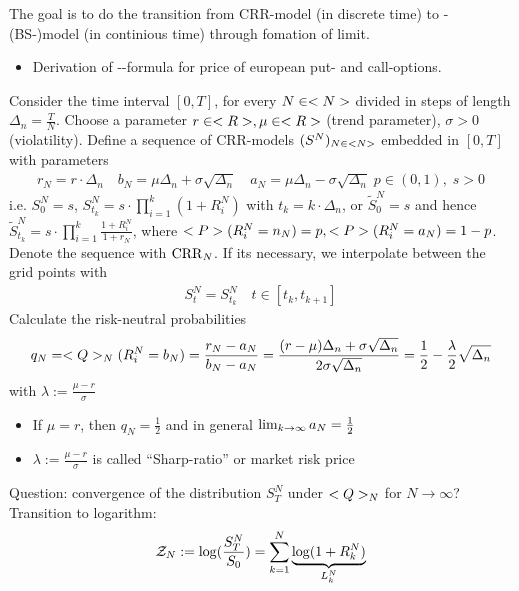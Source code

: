 The goal is to do the transition from CRR-model (in discrete time) to - (BS-)model (in continious time) through fomation of limit.
\begin{itemize}
	\item Derivation of --formula for price of european put- and call-options. 
\end{itemize}
Consider the time interval $[0,T]$, for every $N \in \N$ divided in steps of length $\Delta_n = \frac{T}{N}$. Choose a parameter $r \in \R, \mu \in \R$ (trend parameter), $\sigma > 0$ (violatility). Define a sequence of CRR-models $(S^N)_{N \in \N}$ embedded in $[0,T]$ with parameters
\begin{align*}
	r_N = r \cdot \Delta_n \quad b_N = \mu \Delta_n + \sigma \sqrt{\Delta_n}\quad a_N = \mu \Delta_n - \sigma \sqrt{\Delta_n}\;p \in (0,1),\;s> 0
\end{align*}
i.e. $S^N_0 = s$, $S^N_{t_k} = s \cdot \prod_{i=1}^k (1+R_i^N)$ with $t_k = k \cdot \Delta_n$, or $\tilde{S}_0^N = s$ and hence $\tilde{S}^N_{t_k}= s \cdot \prod_{i=1}^k \frac{1+R_i^N}{1+r_N}$, where $\P(R^N_i = n_N) = p, \P(R^N_i = a_N) = 1-p$.
Denote the sequence with $\CRR_N$. If its necessary, we interpolate between the grid points with
\begin{align*}
	S_t^N = S^N_{t_k} \quad t \in [t_k,t_{k+1}]
\end{align*}
Calculate the risk-neutral probabilities
\begin{align*}
	q_N = \QQ_N(R_i^N = b_N) = \frac{r_N - a_N}{b_N - a_N} = \frac{(r-\mu)\Delta_n + \sigma \sqrt{\Delta_n}}{2\sigma\sqrt{\Delta_n}} = \frac{1}{2} - \frac{\lambda}{2}\sqrt{\Delta_n}
\end{align*}
with $\lambda := \frac{\mu - r}{\sigma}$
\begin{*remark}
	\begin{itemize}
		\item If $\mu = r$, then $q_N = \frac{1}{2}$ and in general $\lim_{k \to \infty}a_N = \half$
		\item $\lambda := \frac{\mu - r}{\sigma}$ is called ``Sharp-ratio'' or market risk price 
	\end{itemize}
\end{*remark}
Question: convergence of the distribution $S^N_T$ under $\QQ_N$ for $N \to \infty$?\\
Transition to logarithm:
\begin{align*}
	\ZZ_N := \log(\frac{S^N_T}{S_0}) = \sum_{k=1}^N \underbrace{\log(1+R_k^N)}_{L^N_k}
\end{align*}
